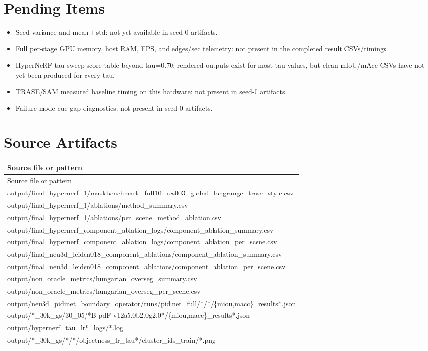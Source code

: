 \documentclass[10pt]{article}
\begin{document}
\section{Pending Items}
\begin{itemize}
\item Seed variance and mean\,\(\pm\)\,std: not yet available in seed-0 artifacts.
\item Full per-stage GPU memory, host RAM, FPS, and edges/sec telemetry: not present in the completed result CSVs/timings.
\item HyperNeRF tau sweep score table beyond tau=0.70: rendered outputs exist for most tau values, but clean mIoU/mAcc CSVs have not yet been produced for every tau.
\item TRASE/SAM measured baseline timing on this hardware: not present in seed-0 artifacts.
\item Failure-mode cue-gap diagnostics: not present in seed-0 artifacts.
\end{itemize}

\section{Source Artifacts}
\small
\begin{longtable}{p{24cm}}
\toprule
Source file or pattern \\
\midrule
\endfirsthead
\toprule
Source file or pattern \\
\midrule
\endhead
output/final\_hypernerf\_1/maskbenchmark\_full10\_res003\_global\_longrange\_trase\_style.csv \\
output/final\_hypernerf\_1/ablations/method\_summary.csv \\
output/final\_hypernerf\_1/ablations/per\_scene\_method\_ablation.csv \\
output/final\_hypernerf\_component\_ablation\_logs/component\_ablation\_summary.csv \\
output/final\_hypernerf\_component\_ablation\_logs/component\_ablation\_per\_scene.csv \\
output/final\_neu3d\_leiden018\_component\_ablations/component\_ablation\_summary.csv \\
output/final\_neu3d\_leiden018\_component\_ablations/component\_ablation\_per\_scene.csv \\
output/non\_oracle\_metrics/hungarian\_overseg\_summary.csv \\
output/non\_oracle\_metrics/hungarian\_overseg\_per\_scene.csv \\
output/neu3d\_pidinet\_boundary\_operator/runs/pidinet\_full/*/*/\{miou,macc\}\_results*.json \\
output/*\_30k\_gs/30\_05/*B-pdF-v12a5.0b2.0g2.0*/\{miou,macc\}\_results*.json \\
output/hypernerf\_tau\_lr*\_logs/*.log \\
output/*\_30k\_gs/*/*/objectness\_lr\_tau*/cluster\_ids\_train/*.png \\
\bottomrule
\end{longtable}
\normalsize
\end{document}
